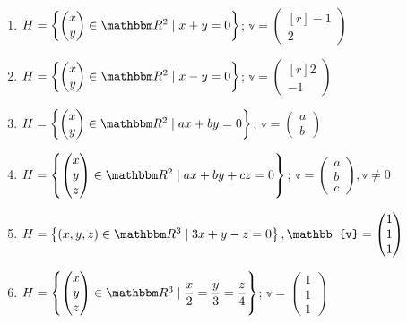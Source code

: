 \begin{enumerate}[start=27]
    \item $H=\left\{\begin{pmatrix*}x \\ y\end{pmatrix*} \in \RR[2] \mid x+y=0\right\}$; $\mathbb{v}=\begin{pmatrix*}[r]-1 \\ 2\end{pmatrix*} \quad$
    \item $H=\left\{\begin{pmatrix*}x \\ y\end{pmatrix*} \in \RR[2] \mid x-y=0\right\}$; $\mathbb{v}=\begin{pmatrix*}[r]2 \\ -1\end{pmatrix*}$
    \item $H=\left\{\begin{pmatrix*}x \\ y\end{pmatrix*} \in \RR[2] \mid a x+b y=0\right\}$; $\mathbb{v}=\begin{pmatrix*}a \\ b\end{pmatrix*}$
    \item $H=\left\{\begin{pmatrix*}x \\ y \\ z\end{pmatrix*} \in \RR[2] \mid a x+b y+c z=0\right\}$; $\mathbb{v}=\begin{pmatrix*}a \\ b \\ c\end{pmatrix*}, \mathbb{v} \neq 0$
    \item $H=\left\{(x, y, z) \in \RR[3] \mid 3 x+y-z=0\right\}, \mathbb{v}=\begin{pmatrix*}1 \\ 1 \\ 1\end{pmatrix*}$
    \item $H=\left\{\begin{pmatrix*}x \\ y \\ z\end{pmatrix*} \in \RR[3] \mid \dfrac{x}{2}=\dfrac{y}{3}=\dfrac{z}{4}\right\}$; $\mathbb{v}=\begin{pmatrix*}1 \\ 1 \\ 1\end{pmatrix*}$

\end{enumerate}
